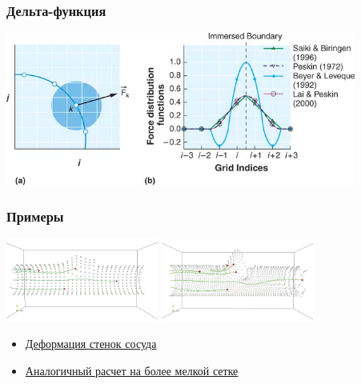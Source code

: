 \documentclass[14pt]{beamer}
\begin{document}
\begin{frame}
\frametitle{Дельта-функция}
    \begin{center}
        \includegraphics[width=11.5cm]{delta_function.png}
    \end{center}
\end{frame}

\begin{frame}
\frametitle{Примеры}
    \begin{center}
        \includegraphics[width=5cm]{cylinder1_avi.png}
        \vspace{0.40mm}
        \includegraphics[width=5cm]{cylinder2_avi.png}
    \end{center}

\begin{itemize}
    \item[\MVRightarrow] \href{run:video/cylinder1.avi}{Деформация стенок сосуда}
    \item[\MVRightarrow] \href{run:video/cylinder2.avi}{Аналогичный расчет на более мелкой сетке}
\end{itemize}
\end{frame}
\end{document}
